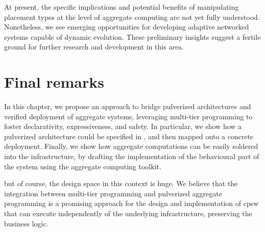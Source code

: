 At present, the specific implications and potential benefits of manipulating placement types at the level of aggregate computing are not yet fully understood. 
 Nonetheless, we see emerging opportunities for developing adaptive networked systems capable of dynamic evolution. 
 These preliminary insights suggest a fertile ground for further research and development in this area.

\section{Final remarks}
\label{conclusion}
In this chapter, we propose an approach 
 to bridge pulverized architectures 
 and verified deployment of aggregate systems,
leveraging multi-tier programming to foster 
 declarativity, expressiveness, and safety. 
%
In particular, we show how a pulverized architecture could be specified in \scalaloci{},
and then mapped onto a concrete deployment.
%
Finally, we show how aggregate computations can be easily soldered into the infrastructure,
by drafting the implementation of the behavioural part of the system using the \scafi{} aggregate computing toolkit.

but of course, the design space in this context is huge.
%
We believe that the integration between multi-tier programming and pulverized aggregate programming is a promising approach for the design and implementation of \ac{cpsw} that can execute independently of the underlying infrastructure,
preserving the business logic.
